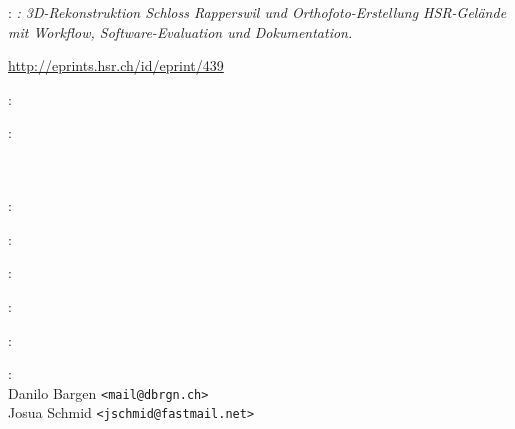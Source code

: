 
\thispagestyle{empty}

\hfill

\vfill

\noindent\myName: \textit{\myTitle: 3D-Rekonstruktion Schloss Rapperswil und
Orthofoto-Erstellung HSR-Gelände mit Workflow, Software-Evaluation und
Dokumentation.}
\textcopyright\ \myTime

\bigskip

\noindent \url{http://eprints.hsr.ch/id/eprint/439}

\bigskip

\noindent{}: \\
\myHackerspace

\medskip

\noindent{}: \\
\myUni \\
\myFaculty \\
\myProf

\medskip

\noindent{}: \\
\myLocation

\medskip

\noindent{}: \\
\myTime

\medskip

\noindent{}: \\
\myVersion

\medskip

\noindent{}: \\
\myLicense

\medskip

\noindent{}: \\
\myRepo

\medskip

\noindent{}: \\
Danilo Bargen \texttt{<mail@dbrgn.ch>}\\
Josua Schmid \texttt{<jschmid@fastmail.net>}
